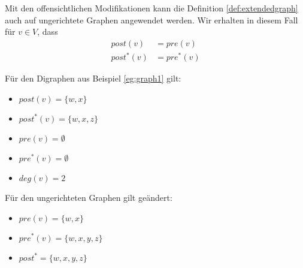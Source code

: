 \begin{remark}
Mit den offensichtlichen Modifikationen kann die Definition \ref{def:extendedgraph} auch auf ungerichtete Graphen angewendet werden. Wir erhalten in diesem Fall für $v \in V$, dass
\begin{align*}
	post(v)&=pre(v) \\
	post^*(v) &= pre^*(v)
\end{align*}
\end{remark}
\begin{example}
Für den Digraphen aus Beispiel \ref{eg:graph1} gilt:
\begin{itemize}
	\item $post(v) = \{w,x\}$
	\item $post^*(v) = \{w,x,z\}$
	\item $pre(v)= \emptyset$
	\item $pre^*(v)= \emptyset$
	\item $deg(v)=2$
\end{itemize}
Für den ungerichteten Graphen gilt geändert:
\begin{itemize}
	\item $pre(v)=\{w,x\}$
	\item $pre^*(v)=\{w,x,y,z\}$
	\item $post^* = \{w,x,y,z\}$
\end{itemize}
\end{example}
